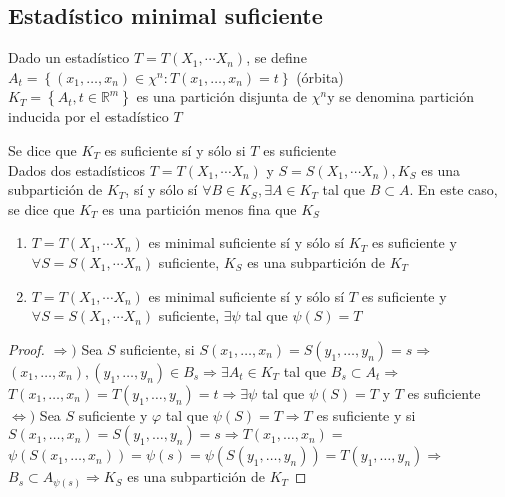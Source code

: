   \subsection*{Estadístico minimal suficiente}
  
  Dado un estadístico $T=T\left(X_{1}, \cdots X_{n}\right)$, se define $A_{t}=\left\{\left(x_{1}, \ldots, x_{n}\right) \in \chi^{n}: T\left(x_{1}, \ldots, x_{n}\right)=t\right\}$ (órbita)\\
  $K_{T}=\left\{A_{t}, t \in \mathbb{R}^{m}\right\}$ es una partición disjunta de $\chi^{n} \mathrm{y}$ se denomina partición inducida por el estadístico $T$
  
  Se dice que $K_{T}$ es suficiente sí y sólo si $T$ es suficiente\\
  Dados dos estadísticos $T=T\left(X_{1}, \cdots X_{n}\right)$ y $S=S\left(X_{1}, \cdots X_{n}\right), K_{S}$ es una subpartición de $K_{T}$, sí y sólo sí $\forall B \in K_{S}, \exists A \in K_{T}$ tal que $B \subset A$. En este caso, se dice que $K_{T}$ es una partición menos fina que $K_{S}$
  
  \begin{definición}
  \vspace{-\baselineskip}
  \vspace{-\baselineskip}
  \begin{enumerate}
    \item $T=T\left(X_{1}, \cdots X_{n}\right)$ es minimal suficiente sí y sólo sí $K_{T}$ es suficiente y $\forall S=S\left(X_{1}, \cdots X_{n}\right)$ suficiente, $K_{S}$ es una subpartición de $K_{T}$\\
    \item $T=T\left(X_{1}, \cdots X_{n}\right)$ es minimal suficiente sí y sólo sí $T$ es suficiente y $\forall S=S\left(X_{1}, \cdots X_{n}\right)$ suficiente, $\exists \psi$ tal que $\psi(S)=T$
  \end{enumerate}
  \end{definición}
  
  \begin{proof}
    $\Rightarrow)$ Sea $S$ suficiente, si $S\left(x_{1}, \ldots, x_{n}\right)=S\left(y_{1}, \ldots, y_{n}\right)=s \Rightarrow$ $\left(x_{1}, \ldots, x_{n}\right),\left(y_{1}, \ldots, y_{n}\right) \in B_{s} \Rightarrow \exists A_{t} \in K_{T}$ tal que $B_{s} \subset A_{t} \Rightarrow$ $T\left(x_{1}, \ldots, x_{n}\right)=T\left(y_{1}, \ldots, y_{n}\right)=t \Rightarrow \exists \psi$ tal que $\psi(S)=T$ y $T$ es suficiente\\
    $\Leftrightarrow)$ Sea $S$ suficiente y $\varphi$ tal que $\psi(S)=T \Rightarrow T$ es suficiente y si $S\left(x_{1}, \ldots, x_{n}\right)=S\left(y_{1}, \ldots, y_{n}\right)=s \Rightarrow T\left(x_{1}, \ldots, x_{n}\right)=$ $\psi\left(S\left(x_{1}, \ldots, x_{n}\right)\right)=\psi(s)=\psi\left(S\left(y_{1}, \ldots, y_{n}\right)\right)=T\left(y_{1}, \ldots, y_{n}\right) \Rightarrow$ $B_{s} \subset A_{\psi(s)} \Rightarrow K_{S}$ es una subpartición de $K_{T}$
  \end{proof}
  
